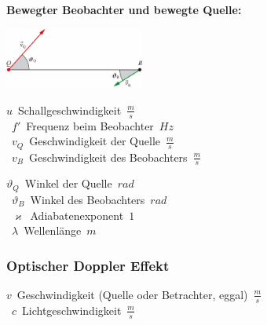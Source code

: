 \begin{center}
	\begin{minipage}{0.3\textwidth}
		\textbf{Bewegter Beobachter und bewegte Quelle:}\\
	\end{minipage}%
	\begin{minipage}{0.2\textwidth}
		\includegraphics[height=2cm,right,keepaspectratio=true]{Images/akustischer_doppler_effekt_bewegter_beobachter_bewegte_quelle.png}
	\end{minipage}
\end{center}

\begin{minipage}{0.25\textwidth}
	\unit{$u$}{Schallgeschwindigkeit}{$\frac{m}{s}$} \\
	\unit{$f'$}{Frequenz beim Beobachter}{$Hz$} \\
	\unit{$v_Q$}{Geschwindigkeit der Quelle}{$\frac{m}{s}$} \\
	\unit{$v_B$}{Geschwindigkeit des Beobachters}{$\frac{m}{s}$}
\end{minipage}%
\begin{minipage}{0.25\textwidth}
	\unit{$\vartheta_Q$}{Winkel der Quelle}{$rad$} \\
	\unit{$\vartheta_B$}{Winkel des Beobachters}{$rad$} \\
	\unit{$\varkappa$}{Adiabatenexponent}{$1$} \\
	\unit{$\lambda$}{Wellenlänge}{$m$}
\end{minipage}






\subsubsection{Optischer Doppler Effekt}

\unit{$v$}{Geschwindigkeit (Quelle oder Betrachter, eggal)}{$\frac{m}{s}$}\\
\unit{$c$}{Lichtgeschwindigkeit}{$\frac{m}{s}$}





